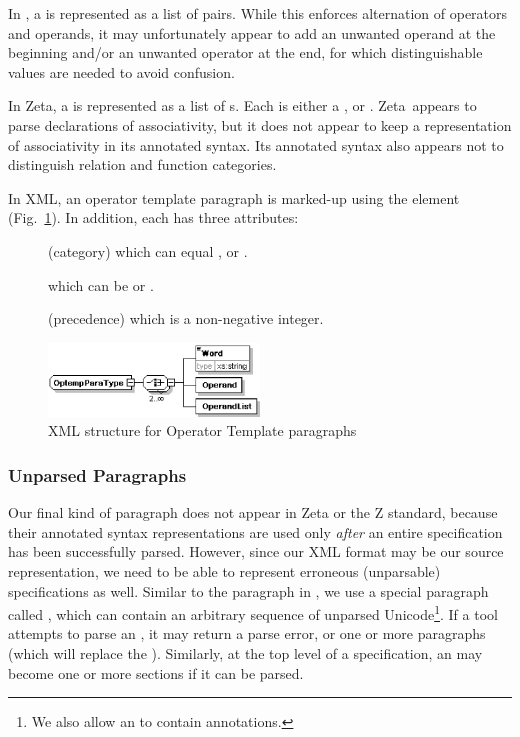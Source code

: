 \documentclass{llncs}  %
\newcommand{\Zeta}{Zeta}
\begin{document}
In \CADiZ, a  is represented as a list of pairs.
While this enforces alternation of operators and operands,
it may unfortunately appear to add an unwanted operand at the beginning
and/or an unwanted operator at the end,
for which distinguishable values are needed to avoid confusion.

In \Zeta, a  is represented as a list of s.
Each  is either a ,  or
.
\Zeta\ appears to parse declarations of associativity,
but it does not appear to keep a representation of associativity
in its annotated syntax.
Its annotated syntax also appears not to distinguish
relation and function categories.

In XML, an operator template paragraph is marked-up using
the  element (Fig.~\ref{fig:optemppara}).
In addition, each  has three attributes:
\begin{description}
\item[] (category) which can equal ,
   or .  
\item[] which can be  or . 
\item[] (precedence) which is a non-negative integer.
\end{description}

\begin{figure}[htbp]
  \centering
  \includegraphics[width=0.5\textwidth]{optempparatype.eps}
  \caption{XML structure for Operator Template paragraphs}
  \label{fig:optemppara}
\end{figure}


\subsubsection{Unparsed Paragraphs}

Our final kind of paragraph does not appear in {\Zeta}
or the Z standard, because their annotated syntax representations
are used only \emph{after} an entire specification has been successfully
parsed.  However, since our XML format may be our source representation,
we need to be able to represent erroneous (unparsable) specifications as
well.  Similar to the  paragraph in \CADiZ, we use a
special paragraph called , which can contain an
arbitrary sequence of unparsed Unicode\footnote{We also allow an
   to contain annotations.}.  If a tool attempts to parse
an , it may return a parse error, or one or more
paragraphs (which will replace the ).  Similarly,
at the top level of a specification, an  may become
one or more sections if it can be parsed.
\end{document}
